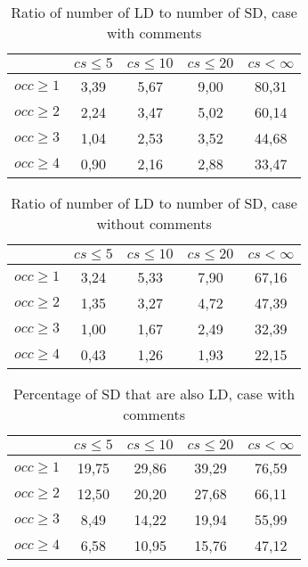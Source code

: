 \documentclass[a4paper,twoside]{article}
\begin{document}
\begin{table}[!h]
\renewcommand{\arraystretch}{1}
\caption{Ratio of number of LD to number of SD, case with comments}
\label{tab:ratio:comm}
\centering

\begin{tabular}{|c|c|c|c|c|}
\hline
	      &	$cs\leq 5$	&	$cs\leq 10$	&	$cs\leq 20$	&	$cs<\infty$	\\
\hline
$occ\geq 1$	&	3,39	&	5,67	&	9,00	&	80,31	\\
$occ\geq 2$	&	2,24	&	3,47	&	5,02	&	60,14	\\
$occ\geq 3$	&	1,04	&	2,53	&	3,52	&	44,68	\\
$occ\geq 4$	&	0,90	&	2,16	&	2,88	&	33,47	\\
\hline
\end{tabular}
\end{table}

\begin{table}[!h]
\renewcommand{\arraystretch}{1}
\caption{Ratio of number of LD to number of SD, case without comments}
\label{tab:ratio:nocomm}
\centering

\begin{tabular}{|c|c|c|c|c|}
\hline
	      &	$cs\leq 5$	&	$cs\leq 10$	&	$cs\leq 20$	&	$cs< \infty$	\\
\hline
$occ\geq 1$	&	3,24	&	5,33	&	7,90	&	67,16	\\
$occ\geq 2$	&	1,35	&	3,27	&	4,72	&	47,39	\\
$occ\geq 3$	&	1,00	&	1,67	&	2,49	&	32,39	\\
$occ\geq 4$	&	0,43	&	1,26	&	1,93	&	22,15	\\
\hline
\end{tabular}
\end{table}

\begin{table}[!h]
\renewcommand{\arraystretch}{1}
\caption{Percentage of SD that are also LD, case with comments}
\label{tab:percSD:comm}
\centering

\begin{tabular}{|c|c|c|c|c|}
\hline
	      &	$cs\leq 5$	&	$cs\leq 10$	&	$cs\leq 20$	&	$cs< \infty$	\\
\hline
$occ\geq 1$	&	19,75	&	29,86	&	39,29	&	76,59	\\
$occ\geq 2$	&	12,50	&	20,20	&	27,68	&	66,11	\\
$occ\geq 3$	&	8,49	&	14,22	&	19,94	&	55,99	\\
$occ\geq 4$	&	6,58	&	10,95	&	15,76	&	47,12	\\
\hline
\end{tabular}
\end{table}
\end{document}
